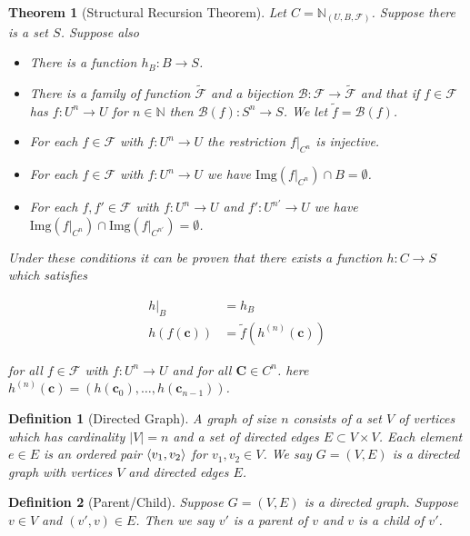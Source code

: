 \documentclass[12pt]{article}
\theoremstyle{break}
\newtheorem{definition}{Definition}[section]
\theoremstyle{break}
\newtheorem{theorem}{Theorem}[section]
\theoremstyle{break}
\theoremstyle{break}
\theoremstyle{break}
\newtheorem{informal definition}[definition]{Informal Definition}
\newcommand{\bv}[1]{\boldsymbol{#1}}
\begin{document}
\begin{theorem}[Structural Recursion Theorem]
Let $C = \mathbb{N}_{(U, B, \mathcal{F})}$.
Suppose there is a set $S$.
Suppose also

\begin{itemize}
\item{There is a function $h_B:B \to S$.}
\item{There is a family of function $\tilde{\mathcal{F}}$ and a bijection $\mathcal{B}: \mathcal{F} \to \tilde{\mathcal{F}}$ and that if $f\in \mathcal{F}$ has $f:U^n \to U$ for $n\in \mathbb{N}$ then $\mathcal{B}(f): S^n \to S$. We let $\tilde{f} = \mathcal{B}(f)$.}
\item{For each $f\in \mathcal{F}$ with $f:U^n \to U$ the restriction $f|_{C^n}$ is injective.}
\item{For each $f\in \mathcal{F}$ with $f:U^n \to U$ we have $\text{Img}(f|_{C^n}) \cap B = \emptyset$.}
\item{For each $f, f' \in \mathcal{F}$ with $f:U^n \to U$ and $f':U^{n'} \to U$ we have $\text{Img}(f|_{C^n}) \cap \text{Img}(f|_{C^{n'}}) = \emptyset$.}
\end{itemize}

Under these conditions it can be proven that there exists a function $h:C\to S$ which satisfies

\begin{align*}
h|_B &= h_B\\
h(f(\bv{c})) &= \tilde{f}(h^{(n)}(\bv{c}))
\end{align*}

for all $f\in \mathcal{F}$ with $f:U^n \to U$ and for all $\bv{C} \in C^n$.
here $h^{(n)}(\bv{c}) = (h(\bv{c}_0), \ldots, h(\bv{c}_{n-1}))$.

\end{theorem}

\begin{definition}[Directed Graph]
A graph of size $n$ consists of a set $V$ of vertices which has cardinality $|V|=n$ and a set of directed edges $E \subset V \times V$.
Each element $e\in E$ is an ordered pair $\braket{v_1, v_2}$ for $v_1, v_2 \in V$.
We say $G=(V, E)$ is a directed graph with vertices $V$ and directed edges $E$.
\end{definition}

\begin{definition}[Parent/Child]
Suppose $G=(V, E)$ is a directed graph.
Suppose $v \in V$ and $(v', v)\in E$.
Then we say $v'$ is a parent of $v$ and $v$ is a child of $v'$.
\end{definition}
\end{document}
